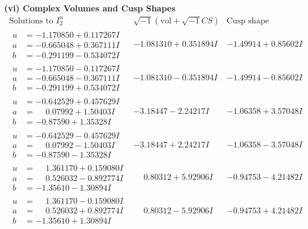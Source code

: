 \documentclass[1p]{elsarticle_modified}
\theoremstyle{definition}
\newcommand{\I}{\sqrt{-1}}
\begin{document}
\newpage\flushleft \textbf{(vi) Complex Volumes and Cusp Shapes}
$$\begin{array}{c|c|c}  
\text{Solutions to }I^u_{2}& \I (\text{vol} + \sqrt{-1}CS) & \text{Cusp shape}\\
 \hline 
\begin{aligned}
u &= -1.170850 + 0.117267 I \\
a &= -0.665048 + 0.367111 I \\
b &= -0.291199 - 0.534072 I\end{aligned}
 & -1.081310 + 0.351894 I & -1.49914 + 0.85602 I \\ \hline\begin{aligned}
u &= -1.170850 - 0.117267 I \\
a &= -0.665048 - 0.367111 I \\
b &= -0.291199 + 0.534072 I\end{aligned}
 & -1.081310 - 0.351894 I & -1.49914 - 0.85602 I \\ \hline\begin{aligned}
u &= -0.642529 + 0.457629 I \\
a &= \phantom{-}0.07992 + 1.50403 I \\
b &= -0.87590 + 1.35328 I\end{aligned}
 & -3.18447 - 2.24217 I & -1.06358 + 3.57048 I \\ \hline\begin{aligned}
u &= -0.642529 - 0.457629 I \\
a &= \phantom{-}0.07992 - 1.50403 I \\
b &= -0.87590 - 1.35328 I\end{aligned}
 & -3.18447 + 2.24217 I & -1.06358 - 3.57048 I \\ \hline\begin{aligned}
u &= \phantom{-}1.361170 + 0.159080 I \\
a &= \phantom{-}0.526032 - 0.892774 I \\
b &= -1.35610 - 1.30894 I\end{aligned}
 & \phantom{-}0.80312 + 5.92906 I & -0.94753 - 4.21482 I \\ \hline\begin{aligned}
u &= \phantom{-}1.361170 - 0.159080 I \\
a &= \phantom{-}0.526032 + 0.892774 I \\
b &= -1.35610 + 1.30894 I\end{aligned}
 & \phantom{-}0.80312 - 5.92906 I & -0.94753 + 4.21482 I \\ \hline\begin{aligned}

\end{aligned}
\end{array}$$
\end{document}
